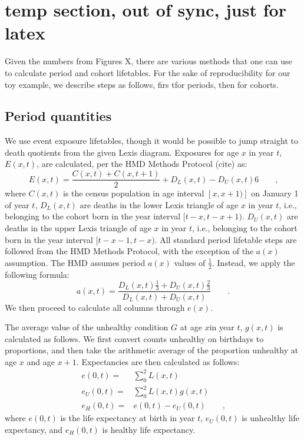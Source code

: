 \documentclass[11pt,oneside,a4paper]{article} %
\newcommand{\tc}{\quad\quad\text{,}}
\newcommand{\tp}{\quad\quad\text{.}}
\begin{document}
\section{temp section, out of sync, just for latex}

Given the numbers from Figures X, there are various methods that one can use to
calculate period and cohort lifetables. For the sake of reproducibility for our
toy example, we describe steps as follows, firs tfor periods, then for cohorts.
\subsection{Period quantities}
We use event exposure lifetables, though it would be possible to jump straight
to death quotients from the given Lexis diagram.
Exposures for age $x$ in year $t$, $E(x,t)$, are calculated, per the HMD Methods
Protocol (cite) as:
\begin{equation}
E(x,t) = \frac{C(x,t) + C(x,t+1)}{2} + {D_L(x,t) - D_U(x,t)}{6} \tc
\end{equation}
where $C(x,t)$ is the census population in age interval $[x,x+1)]$ on January 1
of year $t$, $D_L(x,t)$ are deaths in the lower Lexis triangle of age $x$ in
year $t$, i.e., belonging to the cohort born in the year interval $[t-x,t-x+1)$.
$D_U(x,t)$ are deaths in the upper Lexis triangle of age $x$ in
year $t$, i.e., belonging to the cohort born in the year interval
$[t-x-1,t-x)$. All standard period lifetable steps are followed from the HMD
Methods Protocol, with the exception of the $a(x)$ assumption. The HMD assumes period $a(x)$
values of $\frac{1}{2}$. Instead, we apply the following formula:
\begin{equation}
a(x,t) = \frac{D_L(x,t)\frac{1}{3} + D_U(x,t)\frac{2}{3}}{D_L(x,t) + D_U(x,t)}
\tp
\end{equation}
We then proceed to calculate all columns through $e(x)$. 

The average value of the unhealthy condition $G$ at age $x$in year $t$, $g(x,t)$
is calculated as follows. We first convert counts unhealthy on birthdays to
proportions, and then take the arithmetic average of the proportion unhealthy at
age $x$ and age $x+1$. Expectancies are then calculated as follows:
\begin{align}
e(0,t) =&\sum _0^2 L(x,t) \\
e_U(0,t) =&\sum _0^2 L(x,t) g(x,t) \\
e_H(0,t) =& e(0,t) - e_U(0,t) \tc
\end{align}
where $e(0,t)$ is the life expectancy at birth in year $t$, $e_U(0,t)$ is
unhealthy life expectancy, and $e_H(0,t)$ is healthy life expectancy.
\end{document}
